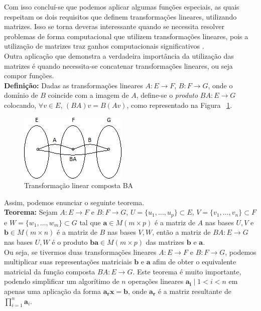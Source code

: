 \documentclass[a4paper,12pt]{article}
\begin{document}
	Com isso concluí-se que podemos aplicar algumas funções especiais, as quais respeitam os dois requisitos que definem transformações lineares, utilizando matrizes. Isso se torna deveras interessante quando se necessita resolver problemas de forma computacional que utilizem transformações lineares, pois a utilização de matrizes traz ganhos computacionais significativos \cite{AlgebraLinearElon}. 
	\\
	
	Outra aplicação que demonstra a verdadeira importância da utilização das matrizes é quando necessita-se concatenar transformações lineares, ou seja compor funções.
	\\ \newline \textbf{Definição:} Dadas as transformações lineares $A: E \longrightarrow F$, $B: F \longrightarrow G$, onde o domínio de $B$ coincide com a imagem de $A$, define-se o \textit{produto} $BA: E \longrightarrow G$ colocando, $\forall v \in E$, $(BA)v = B(Av)$, como representado na Figura ~\ref{fig:compfunc}.
	
	\begin{figure}[H]
		\begin{center}
			\includegraphics[width=0.4\linewidth]{compfunc.png}
		\end{center}
		\caption{Transformação linear composta BA}
		\label{fig:compfunc}
	\end{figure}
	
	Assim, podemos enunciar o seguinte teorema.
	\\ \newline \textbf{Teorema:} Sejam $A: E \longrightarrow F$ e $B: F \longrightarrow G$, $U = \{u_1, \dots, u_p\} \subset E$, $V = \{v_1, \dots, v_n\} \subset F$ e $W = \{w_1, \dots, w_m\} \subset G$ tal que $\mathbf{a} \in M(m\times p)$ é a matriz de $A$ nas bases $U, V$ e $\mathbf{b} \in M(m\times n)$ é a matriz de $B$ nas bases $V, W$, então a matriz de $BA: E\longrightarrow G$ nas bases $U, W$ é o produto $\mathbf{ba} \in M(m\times p)$ das matrizes $\mathbf{b}$ e $\mathbf{a}$. \cite{AlgebraLinearElon}
	\\
	
	Ou seja, se tivermos duas transformações lineares $A: E \longrightarrow F$ e $B: F \longrightarrow G$, podemos multiplicar suas representações matriciais $\mathbf{b}$ e $\mathbf{a}$ afim de obter o equivalente matricial da função composta $BA: E \longrightarrow G$. Este teorema é muito importante, podendo simplificar um algorítimo de $n$ operações lineares $\mathbf{a_i} \mid 1<i<n$ em apenas uma aplicação da forma $\mathbf{a_{r}x} = \mathbf{b}$, onde $\mathbf{a_{r}}$ é a matriz resultante de $\prod_{i=1}^{n}\mathbf{a}_i$.
	\\
	
\end{document}
